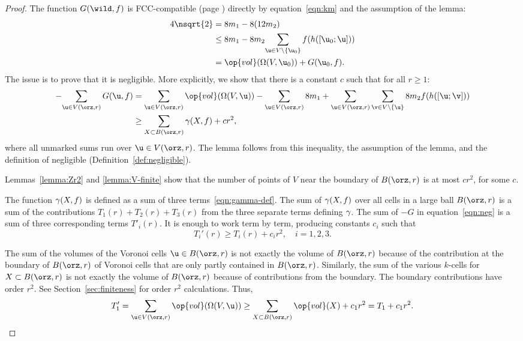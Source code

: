 \begin{cnl}
\begin{proof} 
The function $G(\wild,f)$ is FCC-compatible (page \pageref{def:negligible}) directly
by equation~\eqref{eqn:km}
and the assumption of the lemma:
%
%
\begin{align*} 
4\nsqrt{2} &= 8 m_1 - 8 (12 m_2)\\
&\le 8 m_1 - 8 m_2 \sumfinitepred{\u}{\u\in V\setminus \braced{\u_0} } {f(h([\u_0;\u]))}\\
&= \op{vol}(\Omega(V, \u_0)) + G( \u_0,f).
\end{align*}
The issue is to prove that it is negligible. 
More explicitly, we show that there is a
constant $c$ such that for all $r\ge 1$:%
\begin{align}\label{eqn:neg} 
-\sumfinitepred{\u}{\u\in  \Vee{V}(\orz,r)}{ G( \u,f)} &= 
\sumfinitepred{\u}{\u\in  \Vee{V}(\orz,r)}{ \op{vol}(\Omega(V, \u)) }
-\sumfinitepred{\u}{\u\in  \Vee{V}(\orz,r)}{8m_1} + 
\sumfinitepred{\u}{\u\in  \Vee{V}(\orz,r)}{ \sumfinitepred{\v}{\v\in V\setminus\braced{\u} } {8 m_2 f(h([\u;\v]))}}\notag \\
&\ge \sumfinitepred{X}{X\subset \openBall{\orz}{r}}{\gammaX(X,f)}  + c r^2,
\end{align}
where all unmarked sums run over $ \u\in  \Vee{V}(\orz,r)$.  
The lemma follows from this inequality, the assumption of the lemma,
 and the definition of negligible (Definition~\ref{def:negligible}).

Lemmas~\ref{lemma:Zr2} and \ref{lemma:V-finite} show that the number
of points of $ V$ near the boundary of $\openBall{\orz}{r}$ is at most $c r^2$,
for some $c$.


The function $\gamma(X,f)$ is defined as a sum of three
terms~\eqref{eqn:gamma-def}.  The sum of $\gamma(X,f)$
over all cells in a large ball
$\openBall{\orz}{r}$ is a sum of the contributions $T_1(r) + T_2(r) + T_3(r)$ from
the three separate terms defining $\gamma$.  
The sum of $-G$ in  equation~\eqref{eqn:neg} is a sum of three
corresponding terms $T'_i(r)$.  It is enough to work term by term, producing
constants $c_i$ such that
\[  
T_i'(r) \ge T_i(r) + c_i r^2,\quad i=1,2,3.
\] 

The sum of the volumes of the Voronoi cells $ \u\in \openBall{\orz}{r}$ is not
exactly the volume of $\openBall{\orz}{r}$ because of the contribution at the
boundary of $\openBall{\orz}{r}$ of Voronoi cells that are only partly contained
in $\openBall{\orz}{r}$.  Similarly, the sum of the various $k$-cells for
$X\subset \openBall{\orz}{r}$ is not exactly the volume of $\openBall{\orz}{r}$ because of
contributions from the boundary. The boundary contributions have order
$r^2$.  See Section~\ref{sec:finiteness} for order $r^2$ calculations. 
Thus,
\[  
T_1'= \sumfinitepred{\u}{ \u\in  \Vee{V}(\orz,r)}{ \op{vol}(\Omega(V, \u)) }
\ge \sumfinitepred{X}{X\subset \openBall{\orz}{r}} {\op{vol}(X)} + c_1 r^2 = T_1 + c_1 r^2.
\] 



\end{proof}
\end{cnl}
